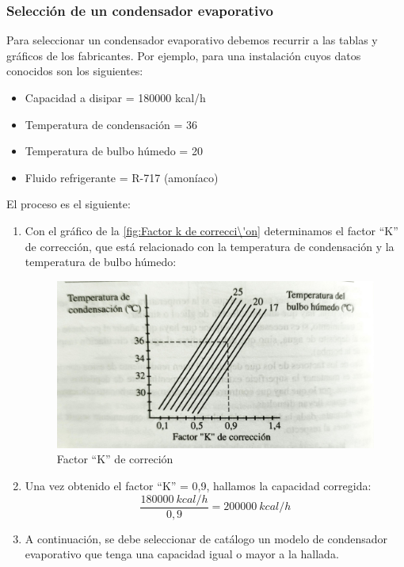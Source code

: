 \subsubsection{Selecci\'on de un condensador evaporativo}

Para seleccionar un condensador evaporativo debemos recurrir a las tablas y gr\'aficos de los fabricantes. Por ejemplo, para una instalaci\'on cuyos datos conocidos son los siguientes:
\begin{itemize}
    \item Capacidad a disipar = 180000 kcal/h
    \item Temperatura de condensaci\'on = 36\textcelsius
    \item Temperatura de bulbo h\'umedo = 20\textcelsius
    \item Fluido refrigerante = R-717 (amon\'iaco)
\end{itemize}
El proceso es el siguiente:
\begin{enumerate}[1.]
    \item Con el gr\'afico de la \autoref{fig:Factor k de correcci\'on} determinamos el factor ``K'' de correcci\'on, que est\'a relacionado con la temperatura de condensaci\'on y la temperatura de bulbo h\'umedo:
    \begin{figure}[H]
        \centering
        \includegraphics[width=0.6\linewidth]{figuras/condensadores/factor k de correcion.jpg}
        \caption{Factor ``K'' de correci\'on}
        \label{fig:Factor k de correcci\'on}
    \end{figure}
    \item Una vez obtenido el factor ``K'' = 0,9, hallamos la capacidad corregida:
    \begin{equation*}
        \frac{180000\ kcal/h}{0,9} = 200000\ kcal/h
    \end{equation*}
    \item A continuaci\'on, se debe seleccionar de cat\'alogo un modelo de condensador evaporativo que tenga una capacidad igual o mayor a la hallada.
\end{enumerate}

